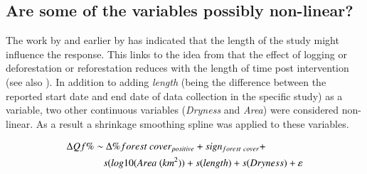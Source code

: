 \documentclass[]{elsarticle} %
\begin{document}
\hypertarget{are-some-of-the-variables-possibly-non-linear}{%
\subsection{Are some of the variables possibly non-linear?}\label{are-some-of-the-variables-possibly-non-linear}}

The work by \citet{filoso2017} and earlier by \citet{jackson2005} has indicated that the length of the study might influence the response. This links to the idea from \citet{kuczera1987} that the effect of logging or deforestation or reforestation reduces with the length of time post intervention (see also \citet{jackson2005}). In addition to adding \emph{length} (being the difference between the reported start date and end date of data collection in the specific study) as a variable, two other continuous variables (\emph{Dryness} and \emph{Area}) were considered non-linear. As a result a shrinkage smoothing spline \citep{wood2006} was applied to these variables.

\begin{align}
\Delta Qf \% \sim &~ \Delta \% forest~cover_{positive} + sign_{forest~cover} + \notag \\ & s(log10(Area ~(km^2)) + s(length) + s(Dryness) + \varepsilon \label{eq:eq7}
\end{align}
\end{document}
